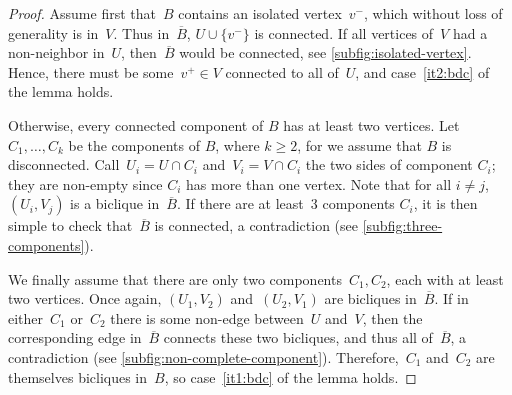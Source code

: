 \documentclass[a4paper,UKenglish,cleveref, autoref, thm-restate]{lipics-v2021}
\renewcommand{\ge}{\geqslant}
\begin{document}
\begin{proof}
  Assume first that~$B$ contains an isolated vertex~$v^-$, which without loss of generality is in~$V$.
  Thus in~$\overline{B}$, $U \cup \{v^-\}$ is connected.
  If all vertices of~$V$ had a non-neighbor in~$U$, then~$\overline{B}$ would be connected, see \cref{subfig:isolated-vertex}.
  Hence, there must be some~$v^+ \in V$ connected to all of~$U$, and case~\ref{it2:bdc} of the lemma holds.

  Otherwise, every connected component of $B$ has at least two vertices. Let $C_1,\dots,C_k$ be the components of $B$, where $k\ge 2$, for we assume that $B$ is disconnected.
  Call~$U_i = U \cap C_i$ and~$V_i = V \cap C_i$ the two sides of component $C_i$; they are non-empty since $C_i$ has more than one vertex.
  Note that for all $i \neq j$, $(U_i,V_j)$ is a biclique in~$\overline{B}$.
  If there are at least~3 components $C_i$, it is then simple to check that~$\overline{B}$ is connected, a contradiction (see \cref{subfig:three-components}).

  We finally assume that there are only two components~$C_1,C_2$, each with at least two vertices.
  Once again, $(U_1,V_2)$ and~$(U_2,V_1)$ are bicliques in~$\overline{B}$.
  If in either~$C_1$ or~$C_2$ there is some non-edge between~$U$ and~$V$,
  then the corresponding edge in~$\overline{B}$ connects these two bicliques, and thus all of~$\overline{B}$, a contradiction (see \cref{subfig:non-complete-component}).
  Therefore,~$C_1$ and~$C_2$ are themselves bicliques in~$B$, so case~\ref{it1:bdc} of the lemma holds.
\end{proof}
\end{document}
